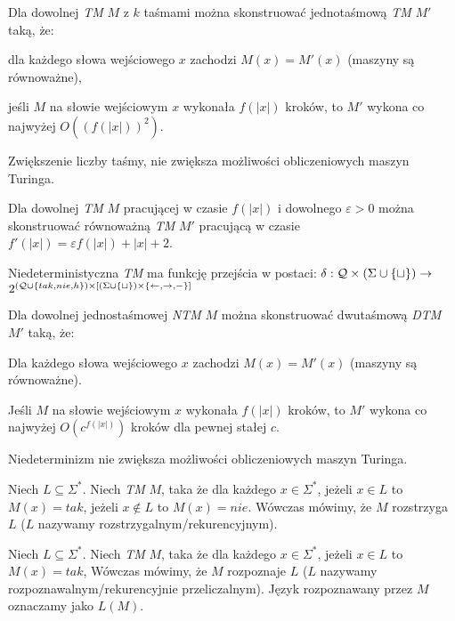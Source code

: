 \begin{twierdzenie}
    Dla dowolnej \textit{TM} $M$ z $k$ taśmami można skonstruować jednotaśmową \textit{TM} $M'$ taką, że:
    \begin{enumerate*}[label=\roman*)]
        \item dla każdego słowa wejściowego $x$ zachodzi $M(x) = M'(x)$ (maszyny są równoważne),
        \item jeśli $M$ na słowie wejściowym $x$ wykonała $f(|x|)$ kroków, to $M'$ wykona co najwyżej $O({(f(|x|))}^2)$.
    \end{enumerate*}
    Zwiększenie liczby taśmy, nie zwiększa możliwości obliczeniowych maszyn Turinga.
\end{twierdzenie}
\begin{twierdzenie}
    Dla dowolnej \textit{TM} $M$ pracującej w czasie $f(|x|)$ i dowolnego $\varepsilon > 0$
    można skonstruować równoważną \textit{TM} $M'$ pracującą w czasie $f'(|x|) = \varepsilon f(|x|) + |x| + 2$.
\end{twierdzenie}
\begin{definicja}
    Niedeterministyczna \textit{TM} ma funkcję przejścia w postaci:
    $\delta : \mathcal{Q} \times {(\Sigma \cup \{\sqcup\})} \rightarrow$ $2^{(\mathcal{Q} \cup \{tak, nie, h\}) \times {[(\Sigma \cup \{\sqcup\}) \times \{\leftarrow, \rightarrow, -\}]}}$
\end{definicja}
\begin{twierdzenie}
    Dla dowolnej jednostaśmowej \textit{NTM} $M$ można skonstruować dwutaśmową \textit{DTM} $M'$ taką, że:
    \begin{enumerate*}[label=\roman*)]
        \item Dla każdego słowa wejściowego $x$ zachodzi $M(x) = M'(x)$ (maszyny są równoważne).
        \item Jeśli $M$ na słowie wejściowym $x$ wykonała $f(|x|)$ kroków, to $M'$ wykona co najwyżej $O(c^{f(|x|)})$ kroków dla pewnej stałej $c$.
    \end{enumerate*}
    Niedeterminizm nie zwiększa możliwości obliczeniowych maszyn Turinga.
\end{twierdzenie}
\begin{definicja}
    Niech $L \subseteq \Sigma^*$. Niech \textit{TM} $M$, taka że dla każdego $x \in \Sigma^{*}$,
    jeżeli $x \in L$ to $M(x) = tak$,
    jeżeli $x \notin L$ to $M(x) = nie$.
    Wówczas mówimy, że $M$ rozstrzyga $L$ ($L$ nazywamy rozstrzygalnym/rekurencyjnym).
\end{definicja}
\begin{definicja}
    Niech $L \subseteq \Sigma^*$. Niech \textit{TM} $M$, taka że dla każdego $x \in \Sigma^{*}$,
    jeżeli $x \in L$ to $M(x) = tak$,
    Wówczas mówimy, że $M$ rozpoznaje $L$ ($L$ nazywamy rozpoznawalnym/rekurencyjnie przeliczalnym).
    Język rozpoznawany przez $M$ oznaczamy jako $L(M)$.
\end{definicja}
